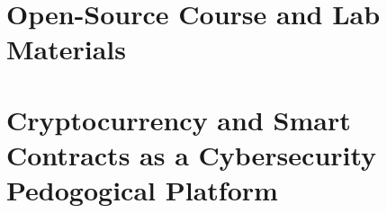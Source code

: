 \documentclass[10pt,twocolumn,letterpaper]{article}
\begin{document}
\section{Open-Source Course and Lab Materials}

\section{Cryptocurrency and Smart Contracts as a Cybersecurity Pedogogical Platform}














\end{document}
